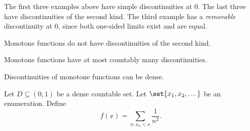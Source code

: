 The first three examples above have simple discontinuities at $0$.
The last three have discontinuities of the second kind.
The third example has a \emph{removable} discontinuity at $0$, since
both one-sided limits exist and are equal.

\begin{theorem}
    Monotone functions do not have discontinuities of the second kind.
\end{theorem}
\begin{corollary}
    Monotone functions have at most countably many discontinuities.
\end{corollary}

\begin{example}
    Discontinuities of monotone functions can be dense.

    Let $D \subseteq (0, 1)$ be a dense countable set.
    Let $\set{x_1, x_2, \dots}$ be an enumeration.
    Define \[
        f(x) = \sum_{n : x_n < x} \frac1{n^2}.
    \]
\end{example}
